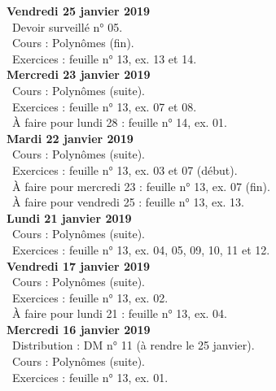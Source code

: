 \documentclass[12pt,a4paper]{article}
\begin{document}
\noindent\textbf{Vendredi 25 janvier 2019}\\
\bu\ Devoir surveillé n° 05.\\
\bu\ Cours : Polynômes (fin).\\
\bu\ Exercices : feuille n° 13, ex. 13 et 14.\vspace{.4cm}\\

\noindent\textbf{Mercredi 23 janvier 2019} \\
\bu\ Cours : Polynômes (suite).\\
\bu\ Exercices : feuille n° 13, ex. 07 et 08.\\
\bu\ À faire pour lundi 28 : feuille n° 14, ex. 01.\vspace{.4cm}\\
 
\noindent\textbf{Mardi 22 janvier 2019} \\
\bu\ Cours : Polynômes (suite).\\
\bu\ Exercices : feuille n° 13, ex. 03 et 07 (début).\\
\bu\ À faire pour mercredi 23 : feuille n° 13, ex. 07 (fin).\\
\bu\ À faire pour vendredi 25 : feuille n° 13, ex. 13.\vspace{.4cm}\\

\noindent\textbf{Lundi 21 janvier 2019} \\
\bu\ Cours : Polynômes (suite).\\
\bu\ Exercices : feuille n° 13, ex. 04, 05, 09, 10, 11 et 12.\vspace{.4cm}\\

\noindent\textbf{Vendredi 17 janvier 2019}\\
\bu\ Cours : Polynômes (suite).\\
\bu\ Exercices : feuille n° 13, ex. 02.\\
\bu\ À faire pour lundi 21 : feuille n° 13, ex. 04.\vspace{.4cm}\\

\noindent\textbf{Mercredi 16 janvier 2019} \\
\bu\ Distribution : DM n° 11 (à rendre le 25 janvier).\\
\bu\ Cours : Polynômes (suite).\\
\bu\ Exercices : feuille n° 13, ex. 01.\vspace{.4cm}\\
\end{document}
